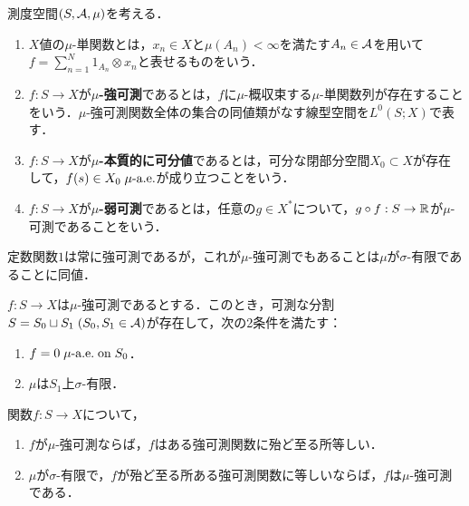\documentclass[uplatex,dvipdfmx]{jsreport}
\begin{document}
\begin{notation}
    測度空間$(S,\mathcal{A},\mu)$を考える．
\end{notation}

\begin{definition}\mbox{}
    \begin{enumerate}
        \item $X$値の$\mu$-単関数とは，$x_n\in X$と$\mu(A_n)<\infty$を満たす$A_n\in\mathcal{A}$を用いて$f=\sum_{n=1}^N1_{A_n}\otimes x_n$と表せるものをいう．
        \item $f:S\to X$が\textbf{$\mu$-強可測}であるとは，$f$に$\mu$-概収束する$\mu$-単関数列が存在することをいう．$\mu$-強可測関数全体の集合の同値類がなす線型空間を$L^0(S;X)$で表す．
        \item $f:S\to X$が\textbf{$\mu$-本質的に可分値}であるとは，可分な閉部分空間$X_0\subset X$が存在して，$f(s)\in X_0\;\mu\text{-a.e.}$が成り立つことをいう．
        \item $f:S\to X$が\textbf{$\mu$-弱可測}であるとは，任意の$g\in X^*$について，$g\circ f:S\to\mathbb{R}$が$\mu$-可測であることをいう．
    \end{enumerate}
\end{definition}

\begin{example}
    定数関数$1$は常に強可測であるが，これが$\mu$-強可測でもあることは$\mu$が$\sigma$-有限であることに同値．
\end{example}

\begin{proposition}
    $f:S\to X$は$\mu$-強可測であるとする．このとき，可測な分割$S=S_0\sqcup S_1\;(S_0,S_1\in\mathcal{A})$が存在して，次の2条件を満たす：
    \begin{enumerate}
        \item $f=0\;\mu\text{-a.e.}\;\mathrm{on}\; S_0$．
        \item $\mu$は$S_1$上$\sigma$-有限．
    \end{enumerate}
\end{proposition}

\begin{proposition}[$\mu$-強可測性と一般の強可測性]
    関数$f:S\to X$について，
    \begin{enumerate}
        \item $f$が$\mu$-強可測ならば，$f$はある強可測関数に殆ど至る所等しい．
        \item $\mu$が$\sigma$-有限で，$f$が殆ど至る所ある強可測関数に等しいならば，$f$は$\mu$-強可測である．
    \end{enumerate}
\end{proposition}
\end{document}
